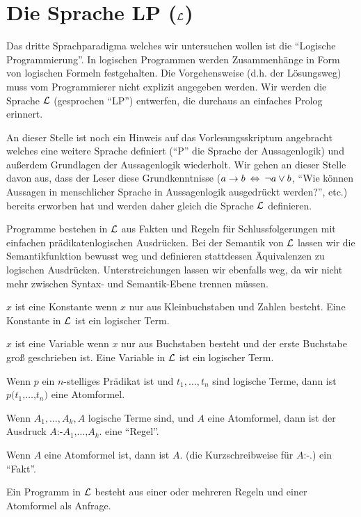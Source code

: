 \section{Die Sprache LP ($\mathcal{L}$)}
Das dritte Sprachparadigma welches wir untersuchen wollen ist die ``Logische Programmierung''.
In logischen Programmen werden Zusammenhänge in Form von logischen Formeln festgehalten.
Die Vorgehensweise (d.h. der Lösungsweg) muss vom Programmierer nicht explizit angegeben werden.
Wir werden die Sprache $\mathcal{L}$ (gesprochen ``LP'') entwerfen, die durchaus an einfaches Prolog erinnert.

An dieser Stelle ist noch ein Hinweis auf das Vorlesungsskriptum angebracht welches eine weitere Sprache
definiert (``P'' die Sprache der Aussagenlogik) und außerdem Grundlagen der Aussagenlogik wiederholt. Wir
gehen an dieser Stelle davon aus, dass der Leser diese Grundkenntnisse ($a \to b \:\Leftrightarrow\: \neg a \vee b$, ``Wie können Aussagen in menschlicher Sprache in Aussagenlogik ausgedrückt werden?'', etc.) bereits erworben hat
und werden daher gleich die Sprache $\mathcal{L}$ definieren.

Programme bestehen in $\mathcal{L}$ aus Fakten und Regeln für Schlussfolgerungen mit einfachen prädikatenlogischen Ausdrücken.
Bei der Semantik von $\mathcal{L}$ lassen wir die Semantikfunktion bewusst weg und definieren stattdessen Äquivalenzen zu logischen Ausdrücken.
Unterstreichungen lassen wir ebenfalls weg, da wir nicht mehr zwischen Syntax- und Semantik-Ebene trennen müssen.

\begin{defn} \quad
\begin{\whichenum}
\item $x$ ist eine Konstante wenn $x$ nur aus Kleinbuchstaben und Zahlen besteht. Eine Konstante in $\mathcal{L}$ ist ein logischer Term.
\item $x$ ist eine Variable wenn $x$ nur aus Buchstaben besteht und der erste Buchstabe groß geschrieben ist. Eine Variable in $\mathcal{L}$ ist ein logischer Term.
\item Wenn $p$ ein $n$-stelliges Prädikat ist und $t_1,\ldots,t_n$ sind logische Terme,
dann ist $p\texttt{(}t_1\texttt{,}\ldots\texttt{,}t_n\texttt{)}$ eine Atomformel.
\item Wenn $A_1,\ldots,A_k,A$ logische Terme sind, und $A$ eine Atomformel, dann ist der Ausdruck $A  \texttt{:-}  A_1  \texttt{,}  \ldots  \texttt{,}  A_k  \texttt{.}$ eine ``Regel''.
\item Wenn $A$ eine Atomformel ist, dann ist $A \texttt{.}$ (die Kurzschreibweise für $A \texttt{:-} \texttt{.}$) ein ``Fakt''.
\item Ein Programm in $\mathcal{L}$ besteht aus einer oder mehreren Regeln und einer Atomformel als Anfrage.
\end{\whichenum}
\end{defn}

